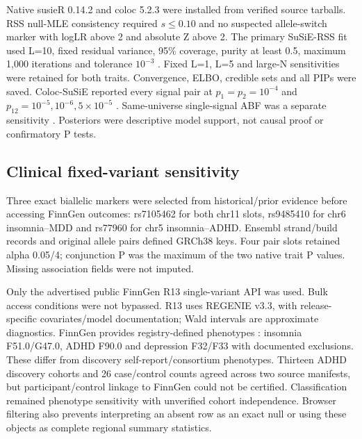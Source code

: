 \documentclass[11pt]{article}
\begin{document}
Native susieR 0.14.2 and coloc 5.2.3 were installed from verified source tarballs. RSS null-MLE consistency required $s\leq0.10$ and no suspected allele-switch marker with logLR above 2 and absolute Z above 2. The primary SuSiE-RSS fit used L=10, fixed residual variance, 95\% coverage, purity at least 0.5, maximum 1,000 iterations and tolerance $10^{-3}$ \cite{rss}. Fixed L=1, L=5 and large-N sensitivities were retained for both traits. Convergence, ELBO, credible sets and all PIPs were saved. Coloc-SuSiE reported every signal pair at $p_1=p_2=10^{-4}$ and $p_{12}=10^{-5},10^{-6},5\times10^{-5}$ \cite{colocsusie}. Same-universe single-signal ABF was a separate sensitivity \cite{colocabf}. Posteriors were descriptive model support, not causal proof or confirmatory P tests.

\subsection*{Clinical fixed-variant sensitivity}
Three exact biallelic markers were selected from historical/prior evidence before accessing FinnGen outcomes: rs7105462 for both chr11 slots, rs9485410 for chr6 insomnia--MDD and rs77960 for chr5 insomnia--ADHD. Ensembl strand/build records and original allele pairs defined GRCh38 keys. Four pair slots retained alpha 0.05/4; conjunction P was the maximum of the two native trait P values. Missing association fields were not imputed.

Only the advertised public FinnGen R13 single-variant API was used. Bulk access conditions were not bypassed. R13 uses REGENIE v3.3, with release-specific covariates/model documentation; Wald intervals are approximate diagnostics. FinnGen provides registry-defined phenotypes \cite{finngen}: insomnia F51.0/G47.0, ADHD F90.0 and depression F32/F33 with documented exclusions. These differ from discovery self-report/consortium phenotypes. Thirteen ADHD discovery cohorts and 26 case/control counts agreed across two source manifests, but participant/control linkage to FinnGen could not be certified. Classification remained phenotype sensitivity with unverified cohort independence. Browser filtering also prevents interpreting an absent row as an exact null or using these objects as complete regional summary statistics.
\end{document}
